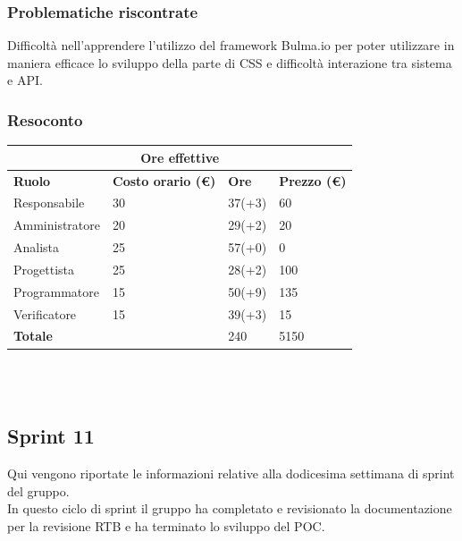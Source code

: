 \documentclass[9pt]{article}
\begin{document}
\subsubsection{Problematiche riscontrate}
Difficoltà nell’apprendere l’utilizzo del framework Bulma.io per poter utilizzare in maniera efficace lo sviluppo della parte di CSS e difficoltà interazione tra sistema e API.


\subsubsection{Resoconto}
\begin{center}
	\begin{tabularx}{\textwidth}{|X|X|X|X|}
		\hline
		\multicolumn{4}{|c|}{\textbf{Ore effettive}}                                      \\
		\hline
		\hline
		\textbf{Ruolo}  & \textbf{Costo orario (\euro)} & \textbf{Ore} & \textbf{Prezzo (\euro)} \\
		\hline
		Responsabile    & 30                            & 37(+3)       & 60                      \\
		\hline
		Amministratore  & 20                            & 29(+2)       & 20                      \\
		\hline
		Analista        & 25                            & 57(+0)       & 0                       \\
		\hline
		Progettista     & 25                            & 28(+2)       & 100                     \\
		\hline
		Programmatore   & 15                            & 50(+9)       & 135                     \\
		\hline
		Verificatore    & 15                            & 39(+3)       & 15                      \\
		\hline
		\hline
		\textbf{Totale} &                               & 240          & 5150                    \\
		\hline
	\end{tabularx}\\[8pt]
	\mbox{}\\
\end{center}

\subsection{Sprint 11}
Qui vengono riportate le informazioni relative alla dodicesima settimana di sprint del gruppo. \\
In questo ciclo di sprint il gruppo ha completato e revisionato la documentazione per la revisione RTB e ha terminato lo sviluppo del POC. \\
\end{document}
